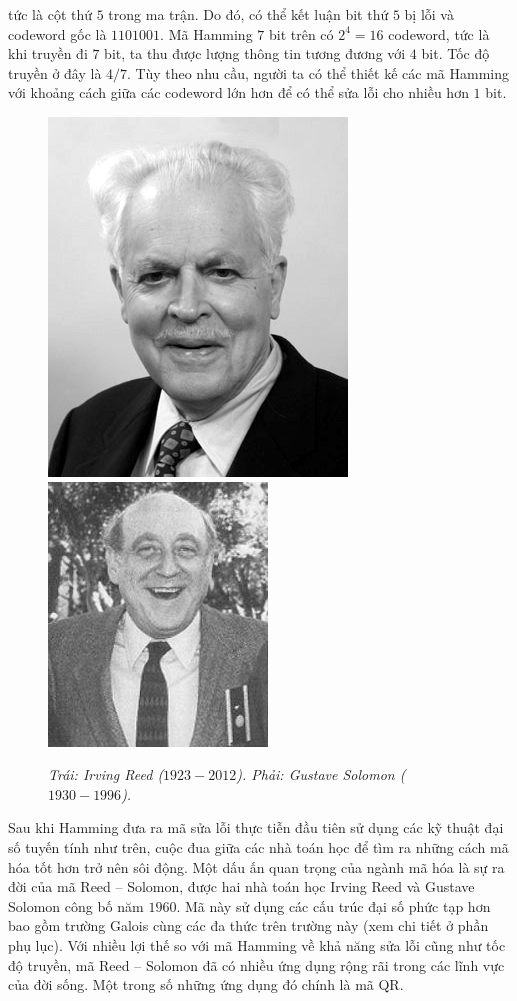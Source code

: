 \begin{multicols}{2}
	tức là cột thứ $5$ trong ma trận. Do đó, có thể kết luận bit thứ $5$ bị lỗi và codeword gốc là $1101001$.
	\vskip 0.1cm
	Mã Hamming $7$ bit trên có $2^4=16$ codeword, tức là khi truyền đi $7$ bit, ta thu được lượng thông tin tương đương với $4$ bit. Tốc độ truyền ở đây là $4/7$. Tùy theo nhu cầu, người ta có thể thiết kế các mã Hamming với khoảng cách giữa các codeword lớn hơn để có thể sửa lỗi cho nhiều hơn $1$ bit.
	\begin{figure}[H]
		\vspace*{-5pt}
		\centering
		\captionsetup{labelformat= empty, justification=centering}
		\includegraphics[height= 0.575\linewidth]{2}
		\includegraphics[height= 0.575\linewidth]{3}
		\caption{\small\textit{\color{toanhocdoisong}Trái: Irving Reed ($1923 - 2012$). Phải: Gustave Solomon ($1930 - 1996$).}}
		\vspace*{-10pt}
	\end{figure}
	Sau khi Hamming đưa ra mã sửa lỗi thực tiễn đầu tiên sử dụng các kỹ thuật đại số tuyến tính như trên, cuộc đua giữa các nhà toán học để tìm ra những cách mã hóa tốt hơn trở nên sôi động. Một dấu ấn quan trọng của ngành mã hóa là sự ra đời của mã Reed -- Solomon, được hai nhà toán học Irving Reed và Gustave Solomon công bố năm $1960$. Mã này sử dụng các cấu trúc đại số phức tạp hơn bao gồm trường Galois cùng các đa thức trên trường này (xem chi tiết ở phần phụ lục). Với nhiều lợi thế so với mã Hamming về khả năng sửa lỗi cũng như tốc độ truyền, mã Reed -- Solomon đã có nhiều ứng dụng rộng rãi trong các lĩnh vực của đời sống. Một trong số những ứng dụng đó chính là mã QR. 

\end{multicols}
